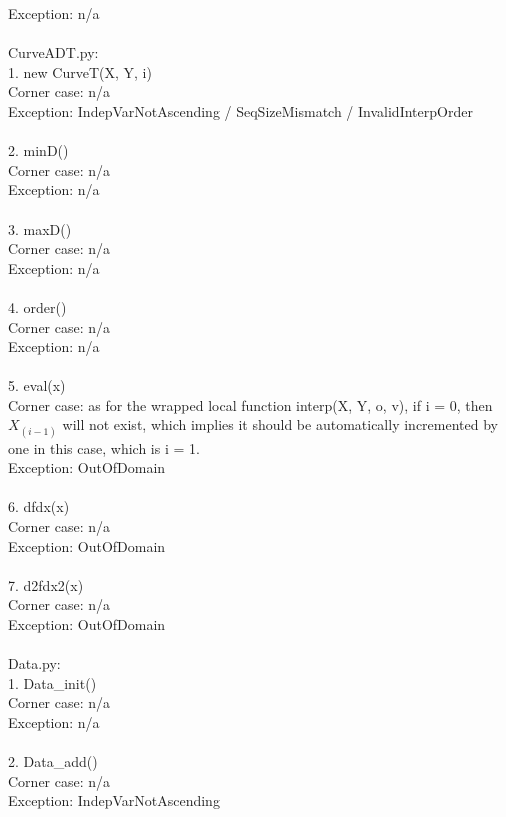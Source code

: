 \documentclass[12pt]{article}
\begin{document}
\phantom{xx}  Exception: n/a\\
\\
\large CurveADT.py:\\
\normalsize 1. new CurveT(X, Y, i)\\
\phantom{xx}  Corner case: n/a\\
\phantom{xx}  Exception: IndepVarNotAscending / SeqSizeMismatch / InvalidInterpOrder\\
\\
2. minD()\\
\phantom{xx}  Corner case: n/a\\
\phantom{xx}  Exception: n/a\\
\\
3. maxD()\\
\phantom{xx}  Corner case: n/a\\
\phantom{xx}  Exception: n/a\\
\\
4. order()\\
\phantom{xx}  Corner case: n/a\\
\phantom{xx}  Exception: n/a\\
\\
5. eval(x)\\
\phantom{xx}  Corner case: as for the wrapped local function interp(X, Y, o, v), if i = 0, then $X_{(i-1)}$ will not exist, which implies it should be automatically incremented by one in this case, which is i = 1.\\
\phantom{xx}  Exception: OutOfDomain\\
\\
6.  dfdx(x)\\
\phantom{xx}  Corner case: n/a\\
\phantom{xx}  Exception: OutOfDomain\\
\\
7. d2fdx2(x)\\
\phantom{xx}  Corner case: n/a\\
\phantom{xx}  Exception: OutOfDomain\\
\\
\large Data.py:\\
\normalsize 1. Data\_init()\\
\phantom{xx}  Corner case: n/a\\
\phantom{xx}  Exception: n/a\\
\\
2. Data\_add()\\
\phantom{xx}  Corner case: n/a\\
\phantom{xx}  Exception: IndepVarNotAscending\\
\end{document}
